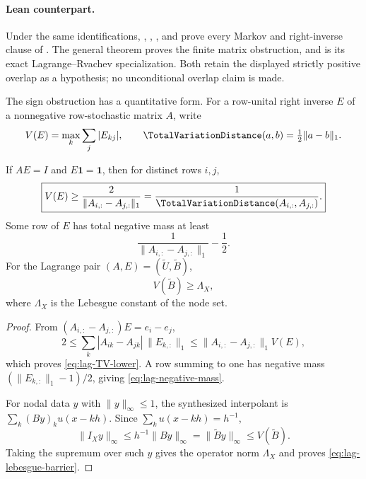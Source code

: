 \paragraph{Lean counterpart.}
Under the same identifications, ,
,
, and
 prove every Markov and
right-inverse clause of .  The general theorem
 proves the finite
matrix obstruction, and
 is its
exact Lagrange--Rvachev specialization.  Both retain the displayed strictly
positive overlap as a hypothesis; no unconditional overlap claim is made.

The sign obstruction has a quantitative form.  For a row-unital right
inverse $E$ of a nonnegative row-stochastic matrix $A$, write
\[
 V(E)=\max_k\sum_j|E_{kj}|,\qquad
 \TotalVariationDistance(a,b)=\tfrac12\|a-b\|_1.
\]

\begin{theorem}
\label{thm:lag-variation}
If $AE=I$ and $E\bm1=\bm1$, then for distinct rows $i,j$,
\begin{equation}
 \boxed{
 V(E)\ge\frac{2}{\|A_{i,:}-A_{j,:}\|_1}
 =\frac1{\TotalVariationDistance(A_{i,:},A_{j,:})}.}
 \label{eq:lag-TV-lower}
\end{equation}
Some row of $E$ has total negative mass at least
\begin{equation}
 \frac1{\|A_{i,:}-A_{j,:}\|_1}-\frac12.
 \label{eq:lag-negative-mass}
\end{equation}
For the Lagrange pair $(A,E)=(\widetilde U,\widetilde B)$,
\begin{equation}
 \boxed{V(\widetilde B)\ge\Lambda_X,}
 \label{eq:lag-lebesgue-barrier}
\end{equation}
where $\Lambda_X$ is the Lebesgue constant of the node set.
\end{theorem}

\begin{proof}
From $(A_{i,:}-A_{j,:})E=e_i-e_j$,
\[
 2\le\sum_k|A_{ik}-A_{jk}|\,\|E_{k,:}\|_1
 \le\|A_{i,:}-A_{j,:}\|_1V(E),
\]
which proves \eqref{eq:lag-TV-lower}.  A row summing to one has negative mass
$(\|E_{k,:}\|_1-1)/2$, giving \eqref{eq:lag-negative-mass}.

For nodal data $y$ with $\|y\|_\infty\le1$, the synthesized interpolant is
$\sum_k(B y)_ku(x-kh)$.  Since $\sum_ku(x-kh)=h^{-1}$,
\[
 \|I_Xy\|_\infty
 \le h^{-1}\|By\|_\infty
 =\|\widetilde By\|_\infty
 \le V(\widetilde B).
\]
Taking the supremum over such $y$ gives the operator norm $\Lambda_X$ and
proves \eqref{eq:lag-lebesgue-barrier}.
\end{proof}

